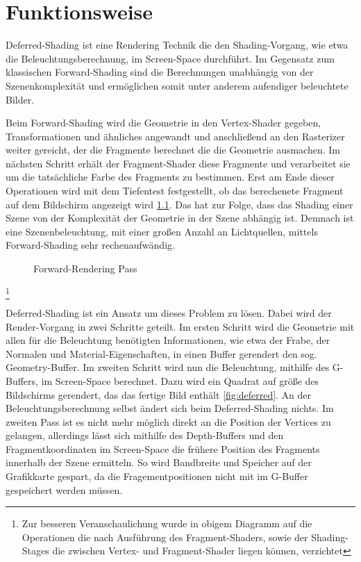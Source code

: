 \chapter{Funktionsweise}
Deferred-Shading ist eine Rendering Technik die den Shading-Vorgang, wie etwa die Beleuchtungsberechnung, im Screen-Space durchführt. Im Gegensatz zum klassischen Forward-Shading sind die Berechnungen unabhängig von der Szenenkomplexität und ermöglichen somit unter anderem aufendiger beleuchtete Bilder.

Beim Forward-Shading wird die Geometrie in den Vertex-Shader gegeben, Transformationen und ähnliches angewandt und anschließend an den Rasterizer weiter gereicht, der die Fragmente berechnet die die Geometrie ausmachen. Im nächsten Schritt erhält der Fragment-Shader diese Fragmente und verarbeitet sie um die tatsächliche Farbe des Fragments zu bestimmen. Erst am Ende dieser Operationen wird mit dem Tiefentest festgestellt, ob das berechenete Fragment auf dem Bildschirm angezeigt wird \ref{fig:forward}. Das hat zur Folge, dass das Shading einer Szene von der Komplexität der Geometrie in der Szene abhängig ist. Demnach ist eine Szenenbeleuchtung, mit einer großen Anzahl an Lichtquellen, mittels Forward-Shading sehr rechenaufwändig.


\begin{figure}
\caption{Forward-Rendering Pass}
\label{fig:forward}
\end{figure}

\footnote{Zur besseren Veranschaulichung wurde in obigem Diagramm auf die Operationen die nach Ausführung des Fragment-Shaders, sowie der Shading-Stages die zwischen Vertex- und Fragment-Shader liegen können, verzichtet}

Deferred-Shading ist ein Ansatz um dieses Problem zu lösen. Dabei wird der Render-Vorgang in zwei Schritte geteilt. Im ersten Schritt wird die Geometrie mit allen für die Beleuchtung benötigten Informationen, wie etwa der Frabe, der Normalen und Material-Eigenschaften, in einen Buffer gerendert \textendash{} den sog. Geometry-Buffer. Im zweiten Schritt wird nun die Beleuchtung, mithilfe des G-Buffers, im Screen-Space berechnet. Dazu wird ein Quadrat auf größe des Bildschirms gerendert, das das fertige Bild enthält \ref{fig:deferred}. An der Beleuchtungsberechnung selbst ändert sich beim Deferred-Shading nichts. Im zweiten Pass ist es nicht mehr möglich direkt an die Position der Vertices zu gelangen, allerdings lässt sich mithilfe des Depth-Buffers und den Fragmentkoordinaten im Screen-Space die frühere Position des Fragments innerhalb der Szene ermitteln. So wird Bandbreite und Speicher auf der Grafikkarte gespart, da die Fragementpositionen nicht mit im G-Buffer gespeichert werden müssen.


